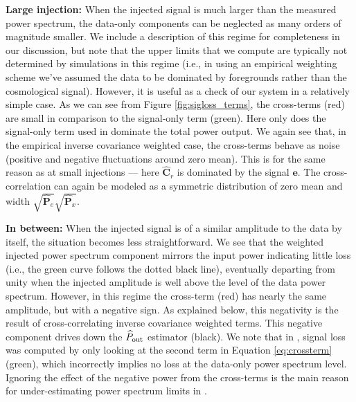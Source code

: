 \documentclass[preprint2,numberedappendix,tighten]{aastex6}  %
\begin{document}
{\bf Large injection:}
When the injected signal is much larger than the measured power spectrum, the data-only components can 
be neglected as many orders of magnitude smaller. We include a description of this regime for completeness in our discussion, but note that the upper limits that we compute are typically not determined by simulations in this regime (i.e., in using an empirical weighting scheme we've assumed the data to be dominated by foregrounds rather than the cosmological signal).  However, it is useful as a check of our system in a relatively simple case. As we can see from Figure \ref{fig:sigloss_terms}, the cross-terms (red) are small in comparison to the signal-only term (green). Here only does the signal-only term used in   dominate the total power output. We again see that, in the empirical inverse covariance weighted case, the cross-terms behave as noise (positive and negative fluctuations around zero mean). This is for the same reason as at small injections --- here $\widehat{\textbf{C}}_{r}$ is dominated by the signal $\textbf{e}$. The cross-correlation can again be modeled as a symmetric distribution of zero mean and width $\sqrt{\widehat{\textbf{P}}_e}\sqrt{\widehat{\textbf{P}}_x}$.

{\bf In between:}
When the injected signal is of a similar amplitude to the data by itself, the situation becomes less straightforward. We see that 
the weighted injected power spectrum component mirrors the input power indicating little loss (i.e., the green curve follows the dotted black line), eventually 
departing from unity when the injected amplitude is well above the level of the data power spectrum. However, 
in this regime the cross-term (red) has nearly the same amplitude, but with a negative sign. As explained below, this negativity is the result of cross-correlating inverse covariance weighted terms.  This negative component drives down the $\widehat{P}_{\rm out}$ estimator (black). We note that in , signal loss was computed by only looking at the second term in Equation \eqref{eq:crossterm} (green), which incorrectly implies no loss at the data-only power spectrum level. Ignoring the effect of the negative power from the cross-terms is the main reason for under-estimating power spectrum limits in .
\end{document}
